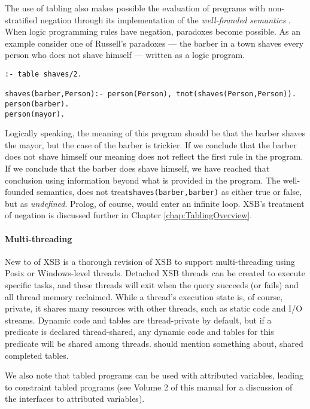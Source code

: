 \begin{example} \label{ex:Russell}
The use of tabling also makes possible the evaluation of programs with
non-stratified negation through its implementation of the {\em
well-founded semantics} \cite{VGRS91}.  When logic programming rules
have negation, paradoxes become possible.  As an example consider one
of Russell's paradoxes --- 
the barber in a town shaves every person who does not shave himself ---
written as a logic program.
\begin{center}
\begin{verbatim} 
:- table shaves/2.

shaves(barber,Person):- person(Person), tnot(shaves(Person,Person)).
person(barber).
person(mayor).
\end{verbatim} 
\end{center}
Logically speaking, the meaning of this program should be that the
barber shaves 
the mayor, but the case of the barber is trickier.  If we conclude
that the barber does not shave himself our meaning does not reflect the 
first rule in the program.  If we conclude that the barber does shave
himself, we have reached that conclusion using information beyond what 
is provided in the program.  The well-founded semantics, does not
treat{\tt shaves(barber,barber)} as either true or false, but as {\em
undefined}. 
Prolog, of course, would enter an infinite loop.  XSB's treatment of
negation is discussed further in Chapter \ref{chap:TablingOverview}.
\end{example}

\paragraph{Multi-threading} New to \version{} of XSB is a thorough
revision of XSB to support multi-threading using Posix or
Windows-level threads.  Detached XSB threads can be created to execute
specific tasks, and these threads will exit when the query succeeds
(or fails) and all thread memory reclaimed.  While a thread's
execution state is, of course, private, it shares many resources with
other threads, such as static code and I/O streams.  Dynamic code and
tables are thread-private by default, but if a predicate is declared
thread-shared, any dynamic code and tables for this predicate will be
shared among threads.  {\sc should mention something about, shared
  completed tables}.

We also note that tabled programs can be used with attributed
variables, leading to constraint tabled programs (see Volume 2 of this
manual for a discussion of the interfaces to attributed variables).

